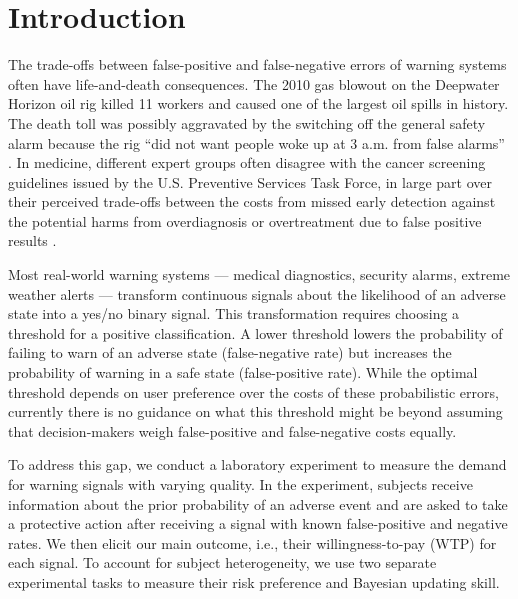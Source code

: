 \documentclass[12pt,a4paper]{article}
\begin{document}
\vspace{180pt}
\newpage
\normalsize

\section{Introduction}

The trade-offs between false-positive and false-negative errors of warning systems often have life-and-death consequences. The 2010 gas blowout on the Deepwater Horizon oil rig killed 11 workers and caused one of the largest oil spills in history. The death toll was possibly aggravated by the switching off the general safety alarm because the rig ``did not want people woke up at 3 a.m. from false alarms'' \citep{brown_oil_2010}. In medicine, different expert groups often disagree with the cancer screening guidelines issued by the U.S. Preventive Services Task Force, in large part over their perceived trade-offs between the costs from missed early detection against the potential harms from overdiagnosis or overtreatment due to false positive results \citep{rabin_reversal_2024}.

Most real-world warning systems --- medical diagnostics, security alarms, extreme weather alerts --- transform continuous signals about the likelihood of an adverse state into a yes/no binary signal. This transformation requires choosing a threshold for a positive classification. A lower threshold lowers the probability of failing to warn of an adverse state (false-negative rate) but increases the probability of warning in a safe state (false-positive rate). While the optimal threshold depends on user preference over the costs of these probabilistic errors, currently there is no guidance on what this threshold might be beyond assuming that decision-makers weigh false-positive and false-negative costs equally.


To address this gap, we conduct a laboratory experiment to measure the demand for warning signals with varying quality.
In the experiment, subjects receive information about the prior probability of an adverse event and are asked to take a protective action after receiving a signal with known false-positive and negative rates. We then elicit our main outcome, i.e., their willingness-to-pay (WTP) for each signal. To account for subject heterogeneity, we use two separate experimental tasks to measure their risk preference and Bayesian updating skill.
\end{document}
